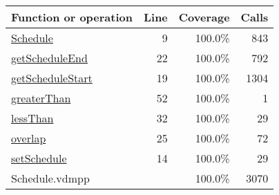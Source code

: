 \bigskip
\begin{longtable}{|l|r|r|r|}
\hline
Function or operation & Line & Coverage & Calls \\
\hline
\hline
\hyperref[Schedule:9]{Schedule} & 9&100.0\% & 843 \\
\hline
\hyperref[getScheduleEnd:22]{getScheduleEnd} & 22&100.0\% & 792 \\
\hline
\hyperref[getScheduleStart:19]{getScheduleStart} & 19&100.0\% & 1304 \\
\hline
\hyperref[greaterThan:52]{greaterThan} & 52&100.0\% & 1 \\
\hline
\hyperref[lessThan:32]{lessThan} & 32&100.0\% & 29 \\
\hline
\hyperref[overlap:25]{overlap} & 25&100.0\% & 72 \\
\hline
\hyperref[setSchedule:14]{setSchedule} & 14&100.0\% & 29 \\
\hline
\hline
Schedule.vdmpp & & 100.0\% & 3070 \\
\hline
\end{longtable}

